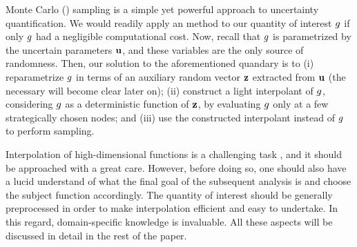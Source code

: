 Monte Carlo () sampling is a simple yet powerful approach to
uncertainty quantification. We would readily apply an  method to our
quantity of interest $g$ if only $g$ had a negligible computational cost. Now,
recall that $g$ is parametrized by the uncertain parameters $\mathbf{u}$, and these
variables are the only source of randomness. Then, our solution to the
aforementioned quandary is to (i) reparametrize $g$ in terms of an auxiliary
random vector $\mathbf{z}$ extracted from $\mathbf{u}$ (the necessary will become clear later
on); (ii) construct a light interpolant of $g$, considering $g$ as a
deterministic function of $\mathbf{z}$, by evaluating $g$ only at a few strategically
chosen nodes; and (iii) use the constructed interpolant instead of $g$ to
perform  sampling.

Interpolation of high-dimensional functions is a challenging task \perse, and it
should be approached with a great care. However, before doing so, one should
also have a lucid understand of what the final goal of the subsequent analysis
is and choose the subject function accordingly. The quantity of interest should
be generally preprocessed in order to make interpolation efficient and easy to
undertake. In this regard, domain-specific knowledge is invaluable. All these
aspects will be discussed in detail in the rest of the paper.

